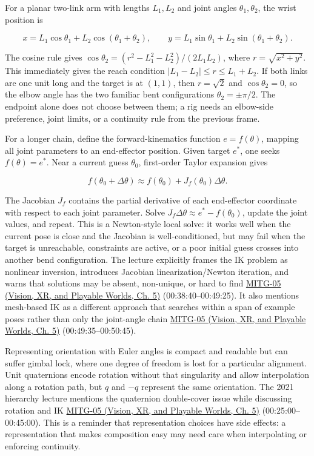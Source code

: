 For a planar two-link arm with lengths \(L_1,L_2\) and joint angles \(\theta_1,\theta_2\), the wrist position is

\[
x=L_1\cos\theta_1+L_2\cos(\theta_1+\theta_2),\qquad
y=L_1\sin\theta_1+L_2\sin(\theta_1+\theta_2).
\]

The cosine rule gives \(\cos\theta_2=(r^2-L_1^2-L_2^2)/(2L_1L_2)\), where \(r=\sqrt{x^2+y^2}\). This immediately gives the reach condition \(|L_1-L_2|\le r\le L_1+L_2\). If both links are one unit long and the target is at \((1,1)\), then \(r=\sqrt2\) and \(\cos\theta_2=0\), so the elbow angle has the two familiar bent configurations \(\theta_2=\pm\pi/2\). The endpoint alone does not choose between them; a rig needs an elbow-side preference, joint limits, or a continuity rule from the previous frame.

For a longer chain, define the forward-kinematics function \(e=f(\theta)\), mapping all joint parameters to an end-effector position. Given target \(e^*\), one seeks \(f(\theta)=e^*\). Near a current guess \(\theta_0\), first-order Taylor expansion gives

\[
f(\theta_0+\Delta\theta)\approx f(\theta_0)+J_f(\theta_0)\Delta\theta.
\]

The Jacobian \(J_f\) contains the partial derivative of each end-effector coordinate with respect to each joint parameter. Solve \(J_f\Delta\theta\approx e^*-f(\theta_0)\), update the joint values, and repeat. This is a Newton-style local solve: it works well when the current pose is close and the Jacobian is well-conditioned, but may fail when the target is unreachable, constraints are active, or a poor initial guess crosses into another bend configuration. The lecture explicitly frames the IK problem as nonlinear inversion, introduces Jacobian linearization/Newton iteration, and warns that solutions may be absent, non-unique, or hard to find \href{../07-Vision-XR-and-Playable-Worlds/main.pdf\#nameddest=04-visual-computing-ii-ch036-mitg-05---hierarchical-modeling}{MITG-05 (Vision, XR, and Playable Worlds, Ch. 5)} (00:38:40--00:49:25). It also mentions mesh-based IK as a different approach that searches within a span of example poses rather than only the joint-angle chain \href{../07-Vision-XR-and-Playable-Worlds/main.pdf\#nameddest=04-visual-computing-ii-ch036-mitg-05---hierarchical-modeling}{MITG-05 (Vision, XR, and Playable Worlds, Ch. 5)} (00:49:35--00:50:45).

Representing orientation with Euler angles is compact and readable but can suffer gimbal lock, where one degree of freedom is lost for a particular alignment. Unit quaternions encode rotation without that singularity and allow interpolation along a rotation path, but \(q\) and \(-q\) represent the same orientation. The 2021 hierarchy lecture mentions the quaternion double-cover issue while discussing rotation and IK \href{../07-Vision-XR-and-Playable-Worlds/main.pdf\#nameddest=04-visual-computing-ii-ch036-mitg-05---hierarchical-modeling}{MITG-05 (Vision, XR, and Playable Worlds, Ch. 5)} (00:25:00--00:45:00). This is a reminder that representation choices have side effects: a representation that makes composition easy may need care when interpolating or enforcing continuity.

